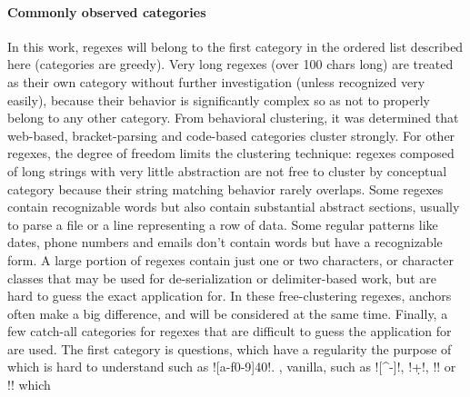 \paragraph{Commonly observed categories} In this work, regexes will belong to the first category in the ordered list described here (categories are greedy).  Very long regexes (over 100 chars long) are treated as their own category without further investigation (unless recognized very easily), because their behavior is significantly complex so as not to properly belong to any other category.  From behavioral clustering, it was determined that web-based, bracket-parsing and code-based categories cluster strongly.  For other regexes, the degree of freedom limits the clustering technique: regexes composed of long strings with very little abstraction are not free to cluster by conceptual category because their string matching behavior rarely overlaps.  Some regexes contain recognizable words but also contain substantial abstract sections, usually to parse a file or a line representing a row of data.  Some regular patterns like dates, phone numbers and emails don't contain words but have a recognizable form.  A large portion of regexes contain just one or two characters, or character classes that may be used for de-serialization or delimiter-based work, but are hard to guess the exact application for.  In these free-clustering regexes, anchors often make a big difference, and will be considered at the same time.  Finally, a few catch-all categories for regexes that are difficult to guess the application for are used.  The first category is questions, which have a regularity the purpose of which is hard to understand such as \cverb![a-f0-9]{40}!.  , vanilla, such as \cverb![^\w\s-]!, \cverb!\d+!, \cverb!! or \cverb!! which



